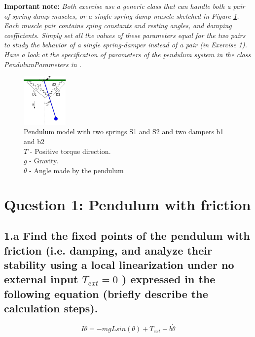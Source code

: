 \documentclass{cmc}
\begin{document}
\textbf{Important note:}
\textit{Both exercise use a generic class that can handle both a pair of
		spring damp muscles, or a single spring damp muscle sketched in Figure
		\ref{fig:spring_mass_damper_sketch}. Each muscle pair
		contains sping constants and resting angles, and damping coefficients.
		Simply set all the values of these parameters equal for the two pairs
		to study the behavior of a single spring-damper instead of a pair (in Exercise 1).
		Have a look at the specification of parameters of the pendulum
		system in the class \textit{PendulumParameters} in .}


\begin{figure}[ht]
  \centering \includegraphics[width=0.2\textwidth]{figures/pendulum_spring_damper}
  \caption[pendulum with spring]{Pendulum model with two springs S1
    and S2 and two dampers b1 and b2\\
    $T$ - Positive torque direction.\\
    $g$ - Gravity.\\
    $\theta$ - Angle made by the pendulum
    \label{fig:spring_mass_damper_sketch} }
\end{figure}



\section*{Question 1: Pendulum with friction}

\subsection*{1.a Find the fixed points of the pendulum with friction
  (i.e. damping, and analyze their stability using a local linearization
  under no external input $T_{ext}=0$ ) expressed in the following equation
  (briefly describe the calculation steps). }


\begin{equation}
  \label{eq:ode-pendulum}
  I\ddot{\theta} = -mgLsin(\theta) + T_{ext} - b \dot{\theta}
\end{equation}
\end{document}
